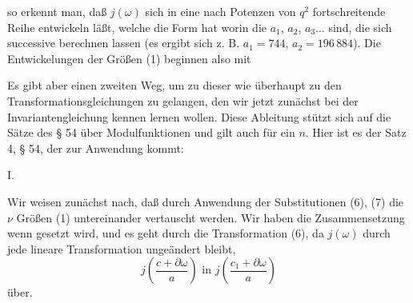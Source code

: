 so erkennt man, daß $j(\omega)$ sich in eine nach Potenzen von $q^2$
fortschreitende Reihe entwickeln läßt, welche die Form hat
worin die $a_1$, $a_2$, $a_3 \ldots$  sind, die sich
successive berechnen lassen (es ergibt sich z. B. $a_1 = 744$,
$a_2 = 196\,884$). Die Entwickelungen der Größen (1) beginnen
also mit

Es gibt aber einen zweiten Weg, um zu dieser wie überhaupt
zu den Transformationsgleichungen zu gelangen, den wir jetzt
zunächst bei der Invariantengleichung kennen lernen wollen.
Diese Ableitung stützt sich auf die Sätze des § 54 über Modulfunktionen
und gilt auch für ein  $n$. Hier ist es der
Satz 4, § 54, der zur Anwendung kommt:

I. 

Wir weisen zunächst nach, daß durch Anwendung der Substitutionen
(6), (7) die $\nu$ Größen (1) untereinander vertauscht
werden. Wir haben die Zusammensetzung
wenn
gesetzt wird, und es geht durch die Transformation (6), da $j(\omega)$
durch jede lineare Transformation ungeändert bleibt,
\[
j\left(\frac{c+\partial\omega}{a}\right) \text{ in } j\left(\frac{c_1+\partial\omega}{a}\right)
\]
über.


